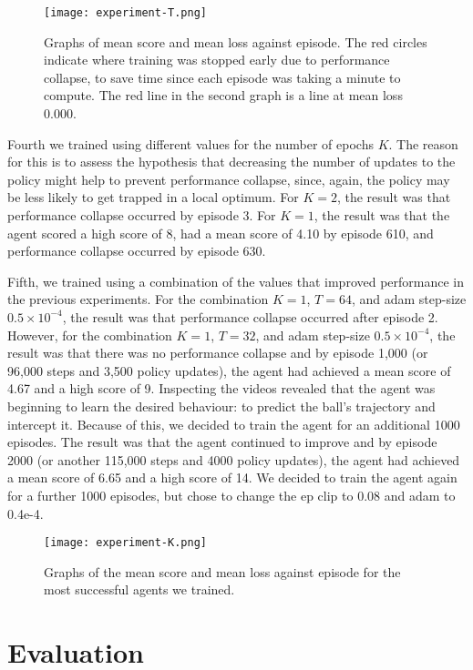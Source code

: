\documentclass[12pt,a4paper]{article}
\begin{document}
\begin{figure}[ht]
\centering
\texttt{[image: experiment-T.png]}
\caption{Graphs of mean score and mean loss against episode. The red circles indicate where training was stopped early due to performance collapse, to save time since each episode was taking a minute to compute. The red line in the second graph is a line at mean loss 0.000.}
\end{figure}

Fourth we trained using different values for the number of epochs $K$. The reason for this is to assess the hypothesis that decreasing the number of updates to the policy might help to prevent performance collapse, since, again, the policy may be less likely to get trapped in a local optimum. For $K=2$, the result was that performance collapse occurred by episode 3. For $K=1$, the result was that the agent scored a high score of 8, had a mean score of 4.10 by episode 610, and performance collapse occurred by episode 630. 

Fifth, we trained using a combination of the values that improved performance in the previous experiments. For the combination $K=1$, $T=64$, and adam step-size $0.5 \times 10^{-4}$, the result was that performance collapse occurred after episode 2. However, for the combination $K=1$, $T=32$, and adam step-size $0.5 \times 10^{-4}$, the result was that there was no performance collapse and by episode 1,000 (or 96,000 steps and 3,500 policy updates), the agent had achieved a mean score of 4.67 and a high score of 9. Inspecting the videos revealed that the agent was beginning to learn the desired behaviour: to predict the ball's trajectory and intercept it. Because of this, we decided to train the agent for an additional 1000 episodes. The result was that the agent continued to improve and by episode 2000 (or another 115,000 steps and 4000 policy updates), the agent had achieved a mean score of 6.65 and a high score of 14. We decided to train the agent again for a further 1000 episodes, but chose to change the ep clip to 0.08 and adam to 0.4e-4.

\begin{figure}[ht]
    \centering
    \texttt{[image: experiment-K.png]}
    \caption{Graphs of the mean score and mean loss against episode for the most successful agents we trained.}
\end{figure}

\section{Evaluation}
\end{document}
